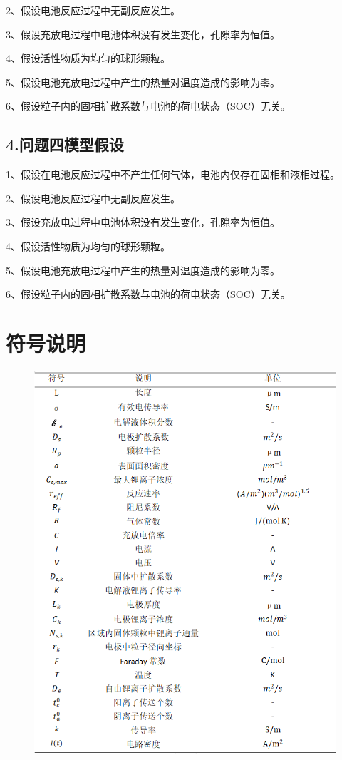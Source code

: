 \documentclass[12pt]{ctexart}%
\begin{document}
2、假设电池反应过程中无副反应发生。

3、假设充放电过程中电池体积没有发生变化，孔隙率为恒值。

4、假设活性物质为均匀的球形颗粒。

5、假设电池充放电过程中产生的热量对温度造成的影响为零。

6、假设粒子内的固相扩散系数与电池的荷电状态（SOC）无关。
\subsection{4.问题四模型假设}
1、假设在电池反应过程中不产生任何气体，电池内仅存在固相和液相过程。

2、假设电池反应过程中无副反应发生。

3、假设充放电过程中电池体积没有发生变化，孔隙率为恒值。

4、假设活性物质为均匀的球形颗粒。

5、假设电池充放电过程中产生的热量对温度造成的影响为零。

6、假设粒子内的固相扩散系数与电池的荷电状态（SOC）无关。

\section{符号说明}

\begin{figure}[H]
	\centering
	\includegraphics[scale = 0.7]{7}
\end{figure}
\end{document}
